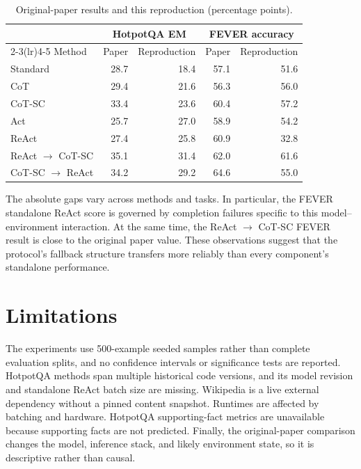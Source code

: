 \documentclass[10pt]{article}
\begin{document}
\begin{table}[htbp]
\centering
\caption{Original-paper results and this reproduction (percentage points).}
\label{tab:paper-comparison}
\small
\begin{tabular}{lrrrr}
\toprule
& \multicolumn{2}{c}{HotpotQA EM} & \multicolumn{2}{c}{FEVER accuracy} \\
\cmidrule(lr){2-3}\cmidrule(lr){4-5}
Method & Paper & Reproduction & Paper & Reproduction \\
\midrule
Standard & 28.7 & 18.4 & 57.1 & 51.6 \\
CoT & 29.4 & 21.6 & 56.3 & 56.0 \\
CoT-SC & 33.4 & 23.6 & 60.4 & 57.2 \\
Act & 25.7 & 27.0 & 58.9 & 54.2 \\
ReAct & 27.4 & 25.8 & 60.9 & 32.8 \\
ReAct $\rightarrow$ CoT-SC & 35.1 & 31.4 & 62.0 & 61.6 \\
CoT-SC $\rightarrow$ ReAct & 34.2 & 29.2 & 64.6 & 55.0 \\
\bottomrule
\end{tabular}
\end{table}

The absolute gaps vary across methods and tasks. In particular, the FEVER standalone ReAct score is governed by completion failures specific to this model--environment interaction. At the same time, the ReAct $\rightarrow$ CoT-SC FEVER result is close to the original paper value. These observations suggest that the protocol's fallback structure transfers more reliably than every component's standalone performance.

\section{Limitations}

The experiments use 500-example seeded samples rather than complete evaluation splits, and no confidence intervals or significance tests are reported. HotpotQA methods span multiple historical code versions, and its model revision and standalone ReAct batch size are missing. Wikipedia is a live external dependency without a pinned content snapshot. Runtimes are affected by batching and hardware. HotpotQA supporting-fact metrics are unavailable because supporting facts are not predicted. Finally, the original-paper comparison changes the model, inference stack, and likely environment state, so it is descriptive rather than causal.
\end{document}
